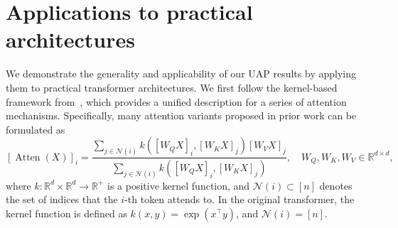 \documentclass{article}
\newtheorem{proposition}{Proposition}
\newcommand{\ql}[1]{{\footnotesize\textcolor{red}{QL: #1}}}
\begin{document}






\section{Applications to practical architectures}
\label{sec:app}

We demonstrate the generality and  applicability
of our UAP results by applying them to practical transformer architectures.
We first follow the kernel-based framework from~\cite{tsai2019transformer}, which provides a unified description for a series of attention mechanisms. Specifically, many attention variants proposed in prior work can be formulated as
\begin{equation}
    \label{eq:kernel_atten}
    [\operatorname{Atten}(X)]_i=\frac{\sum_{j\in\mathcal N(i)} k([W_QX]_i,[W_KX]_j)[W_VX]_j}{\sum_{j\in\mathcal N(i)} k([W_QX]_i,[W_KX]_j)}, \quad W_Q, W_K, W_V\in\mathbb{R}^{d\times d},
\end{equation}
where $k:\mathbb{R}^d\times \mathbb{R}^d\to \mathbb{R}^+$ is a positive kernel function, and $\mathcal N(i)\subset [n]$ denotes the set of indices that the $i$-th token attends to.
In the original transformer, the kernel function is defined as $k(x,y)=\exp(x^\top y)$, and $\mathcal{N}(i) = [n]$.
\end{document}
